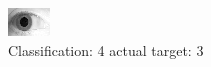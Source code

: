 \begin{figure}[h!]
\begin{center}
\includegraphics[width=0.60\columnwidth]{figures/ID1909_class_4_target_3.png}
\end{center}
\caption{ Classification: 4 actual target: 3}
\label{fig:ID1909_class_4_target_3}
\end{figure}
